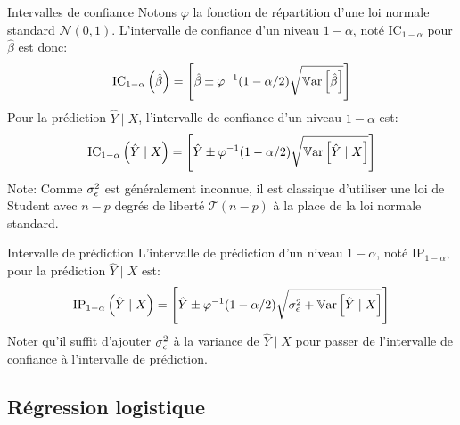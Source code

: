 \begin{frame}{Intervalles de confiance}
	Notons $\varphi$ la fonction de répartition d'une loi normale standard $\mathcal{N}(0, 1)$. L'intervalle de confiance d'un niveau $1-\alpha$, noté $\text{IC}_{1-\alpha}$ pour $\hat{\beta}$ est donc:
	\begin{equation}
		\text{IC}_{1-\alpha}\left(\hat{\beta}\right) = \left[\hat{\beta} \pm \varphi^{-1}(1-\alpha / 2) \sqrt{\operatorname{\mathbb{V}ar}\left[\hat{\beta}\right]}\right]
		\nonumber
	\end{equation}
	\pause
	Pour la prédiction $\hat{Y} \mid X$, l'intervalle de confiance d'un niveau $1-\alpha$ est:
	\begin{equation}
		\begin{split}
			\text{IC}_{1-\alpha}\left(\hat{Y} \mid X\right) = \Biggl[ \hat{Y} \pm \varphi^{-1}(1-\alpha / 2) \sqrt{\operatorname{\mathbb{V}ar}\left[\hat{Y} \mid X\right]} \Biggr]
		\end{split}
		\nonumber
	\end{equation}
	\pause
	Note: Comme $\sigma_{\epsilon}^2$ est généralement inconnue, il est classique d'utiliser une loi de Student avec $n - p$ degrés de liberté $\mathcal{T}(n - p)$ à la place de la loi normale standard.
\end{frame}

\begin{frame}{Intervalle de prédiction}
	L'intervalle de prédiction d'un niveau $1-\alpha$, noté $\text{IP}_{1-\alpha}$, pour la prédiction $\hat{Y} \mid X$ est:
	\begin{equation}
		\begin{split}
			\text{IP}_{1-\alpha}\left(\hat{Y} \mid X\right) = \Biggl[ \hat{Y} \pm \varphi^{-1}(1-\alpha / 2) \sqrt{\sigma_{\epsilon}^2 + \operatorname{\mathbb{V}ar}\left[\hat{Y} \mid X\right]} \Biggr]
		\end{split}
		\nonumber
	\end{equation}
	\pause
	Noter qu'il suffit d'ajouter $\sigma_{\epsilon}^2$ à la variance de $\hat{Y} \mid X$ pour passer de l'intervalle de confiance à l'intervalle de prédiction.
\end{frame}

\subsection[Régression logistique]{Régression logistique}

